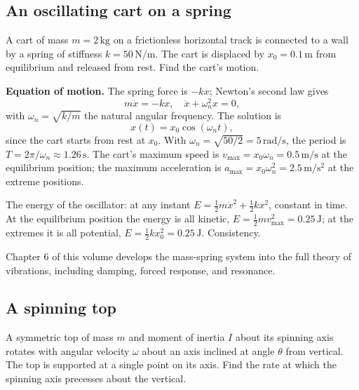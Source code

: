 \subsection{An oscillating cart on a spring}

A cart of mass $m = 2\,\si{\kilogram}$ on a frictionless horizontal
track is connected to a wall by a spring of stiffness $k = 50\,\si{
\newton\per\meter}$. The cart is displaced by $x_0 = 0.1\,\si{\meter}$
from equilibrium and released from rest. Find the cart's motion.

\textbf{Equation of motion.} The spring force is $-kx$; Newton's
second law gives
\[
m\ddot{x} = -kx, \quad \ddot{x} + \omega_n^2 x = 0,
\]
with $\omega_n = \sqrt{k/m}$ the natural angular frequency. The
solution is
\[
x(t) = x_0 \cos(\omega_n t),
\]
since the cart starts from rest at $x_0$. With $\omega_n = \sqrt{50/2}
= 5\,\si{\radian\per\second}$, the period is $T = 2\pi/\omega_n
\approx 1.26\,\si{\second}$. The cart's maximum speed is $v_{\max} =
x_0 \omega_n = 0.5\,\si{\meter\per\second}$ at the equilibrium
position; the maximum acceleration is $a_{\max} = x_0 \omega_n^2 =
2.5\,\si{\meter\per\second\squared}$ at the extreme positions.

The energy of the oscillator: at any instant $E = \tfrac{1}{2} m
\dot{x}^2 + \tfrac{1}{2} k x^2$, constant in time. At the
equilibrium position the energy is all kinetic, $E = \tfrac{1}{2} m
v_{\max}^2 = 0.25\,\si{\joule}$; at the extremes it is all potential,
$E = \tfrac{1}{2} k x_0^2 = 0.25\,\si{\joule}$. Consistency.

Chapter 6 of this volume develops the mass-spring system into the
full theory of vibrations, including damping, forced response,
and resonance.

\subsection{A spinning top}

A symmetric top of mass $m$ and moment of inertia $I$ about its
spinning axis rotates with angular velocity $\omega$ about an axis
inclined at angle $\theta$ from vertical. The top is supported at a
single point on its axis. Find the rate at which the spinning axis
precesses about the vertical.

